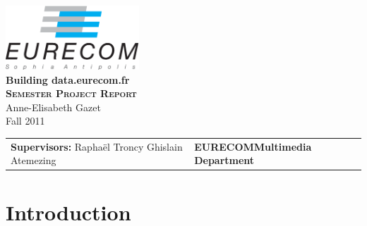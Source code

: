 \documentclass[a4paper,11pt]{report}
\begin{document}
\begin{titlepage}
\begin{center}
\includegraphics[width=5cm]{EURECOM_logo_quadri}
\\[3cm]
\textbf{\Huge{Building data.eurecom.fr}}
\\[2cm]
\textbf{\textsc{\LARGE{Semester Project Report}}}
\\[0.5cm]
\LARGE{Anne-Elisabeth Gazet}
\\
\large{Fall 2011}
\\[8cm]
\begin{tabular}{p{8cm} p{8.5cm}}
\small{\textbf{Supervisors:}\newline
Rapha\"el Troncy\newline
Ghislain Atemezing} 
&
\small{\textbf{EURECOM\newline Multimedia Department}}
\end{tabular}
\end{center}
\end{titlepage}

 \tableofcontents

\chapter*{Introduction}
\end{document}
